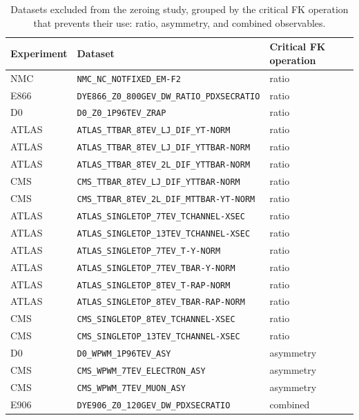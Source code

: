 \documentclass[11pt,a4paper]{article}
\begin{document}
\begin{table}[htbp]
\centering
\small
\begin{tabular}{lll}
\toprule
Experiment & Dataset & Critical FK operation \\
\midrule
NMC & \texttt{NMC\_NC\_NOTFIXED\_EM-F2} & ratio \\
E866 & \texttt{DYE866\_Z0\_800GEV\_DW\_RATIO\_PDXSECRATIO} & ratio \\
D0 & \texttt{D0\_Z0\_1P96TEV\_ZRAP} & ratio \\
ATLAS & \texttt{ATLAS\_TTBAR\_8TEV\_LJ\_DIF\_YT-NORM} & ratio \\
ATLAS & \texttt{ATLAS\_TTBAR\_8TEV\_LJ\_DIF\_YTTBAR-NORM} & ratio \\
ATLAS & \texttt{ATLAS\_TTBAR\_8TEV\_2L\_DIF\_YTTBAR-NORM} & ratio \\
CMS & \texttt{CMS\_TTBAR\_8TEV\_LJ\_DIF\_YTTBAR-NORM} & ratio \\
CMS & \texttt{CMS\_TTBAR\_8TEV\_2L\_DIF\_MTTBAR-YT-NORM} & ratio \\
ATLAS & \texttt{ATLAS\_SINGLETOP\_7TEV\_TCHANNEL-XSEC} & ratio \\
ATLAS & \texttt{ATLAS\_SINGLETOP\_13TEV\_TCHANNEL-XSEC} & ratio \\
ATLAS & \texttt{ATLAS\_SINGLETOP\_7TEV\_T-Y-NORM} & ratio \\
ATLAS & \texttt{ATLAS\_SINGLETOP\_7TEV\_TBAR-Y-NORM} & ratio \\
ATLAS & \texttt{ATLAS\_SINGLETOP\_8TEV\_T-RAP-NORM} & ratio \\
ATLAS & \texttt{ATLAS\_SINGLETOP\_8TEV\_TBAR-RAP-NORM} & ratio \\
CMS & \texttt{CMS\_SINGLETOP\_8TEV\_TCHANNEL-XSEC} & ratio \\
CMS & \texttt{CMS\_SINGLETOP\_13TEV\_TCHANNEL-XSEC} & ratio \\
\midrule
D0 & \texttt{D0\_WPWM\_1P96TEV\_ASY} & asymmetry \\
CMS & \texttt{CMS\_WPWM\_7TEV\_ELECTRON\_ASY} & asymmetry \\
CMS & \texttt{CMS\_WPWM\_7TEV\_MUON\_ASY} & asymmetry \\
\midrule
E906 & \texttt{DYE906\_Z0\_120GEV\_DW\_PDXSECRATIO} & combined \\
\bottomrule
\end{tabular}
\caption{Datasets excluded from the zeroing study, grouped by the critical FK operation that prevents their use: ratio, asymmetry, and combined observables.}
\label{tab:discarded_datasets_ablation}
\end{table}
\end{document}
